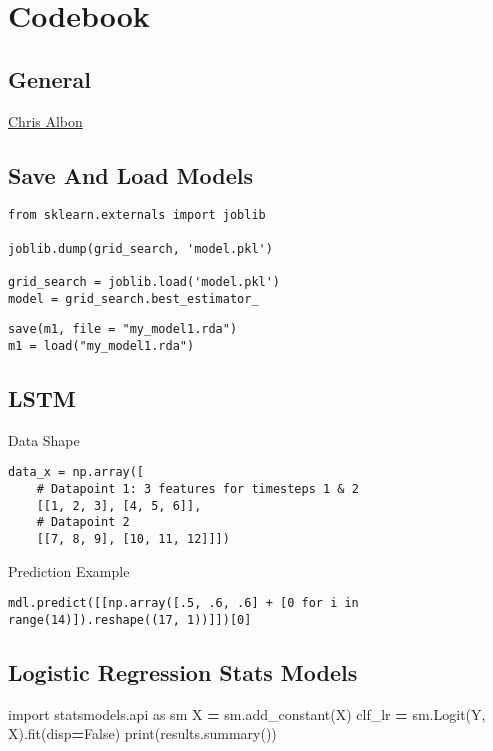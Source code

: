 \documentclass[]{book}
\newenvironment{Shaded}{\begin{snugshade}}{\end{snugshade}}
\newcommand{\ImportTok}[1]{#1}
\newcommand{\VariableTok}[1]{\textcolor[rgb]{0.00,0.00,0.00}{#1}}
\newcommand{\OperatorTok}[1]{\textcolor[rgb]{0.81,0.36,0.00}{\textbf{#1}}}
\newcommand{\BuiltInTok}[1]{#1}
\newcommand{\NormalTok}[1]{#1}
\begin{document}
\chapter{Codebook}\label{codebook}

\section{General}\label{general-11}

\href{http://chrisalbon.com/}{Chris Albon}

\section{Save And Load Models}\label{save-and-load-models}

\begin{verbatim}
from sklearn.externals import joblib

joblib.dump(grid_search, 'model.pkl')

grid_search = joblib.load('model.pkl')
model = grid_search.best_estimator_
\end{verbatim}

\begin{verbatim}
save(m1, file = "my_model1.rda")
m1 = load("my_model1.rda")
\end{verbatim}

\section{LSTM}\label{lstm}

Data Shape

\begin{verbatim}
data_x = np.array([
    # Datapoint 1: 3 features for timesteps 1 & 2
    [[1, 2, 3], [4, 5, 6]],
    # Datapoint 2
    [[7, 8, 9], [10, 11, 12]]])
\end{verbatim}

Prediction Example

\begin{verbatim}
mdl.predict([[np.array([.5, .6, .6] + [0 for i in range(14)]).reshape((17, 1))]])[0]
\end{verbatim}

\section{Logistic Regression Stats
Models}\label{logistic-regression-stats-models}

\begin{Shaded}
\begin{Highlighting}[]
\ImportTok{import}\NormalTok{ statsmodels.api }\ImportTok{as}\NormalTok{ sm}
\NormalTok{X }\OperatorTok{=}\NormalTok{ sm.add_constant(X)}
\NormalTok{clf_lr }\OperatorTok{=}\NormalTok{ sm.Logit(Y, X).fit(disp}\OperatorTok{=}\VariableTok{False}\NormalTok{)}
\BuiltInTok{print}\NormalTok{(results.summary())}
\end{Highlighting}
\end{Shaded}
\end{document}

